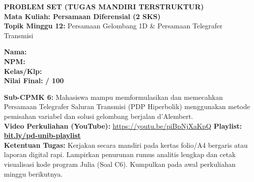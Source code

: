 \documentclass[10pt,a4paper]{article}
\begin{document}
\noindent\begin{minipage}[c]{0.68\textwidth}%
  {\large\textbf{\color{unibblue}PROBLEM SET (TUGAS MANDIRI TERSTRUKTUR)}}\\[1mm]
  {\normalsize\textbf{Mata Kuliah: Persamaan Diferensial (2 SKS)}}\\[0.5mm]
  {\small\textbf{Topik Minggu 12:} Persamaan Gelombang 1D \& Persamaan Telegrafer Transmisi}%
\end{minipage}%
\hfill%
\begin{minipage}[c]{0.30\textwidth}%
  \begin{tcolorbox}[colback=unibblue!5,colframe=unibblue,boxrule=0.6pt,arc=2pt,left=4pt,right=4pt,top=2pt,bottom=2pt]
    \scriptsize
    \textbf{Nama:} \dotfill\\[1.2mm]
    \textbf{NPM:} \dotfill\\[1.2mm]
    \textbf{Kelas/Klp:} \dotfill\\[1.2mm]
    \textbf{Nilai Final:} \hfill \textbf{/ 100}
  \end{tcolorbox}%
\end{minipage}\par

\vspace{1.5mm}

\begin{tcolorbox}[colback=boxbg,colframe=unibgold!90!black,boxrule=0.6pt,arc=2pt,left=5pt,right=5pt,top=3pt,bottom=3pt,title=\textbf{\scriptsize Capaian Pembelajaran (Sub-CPMK 6) \& Pedoman Pengerjaan Tugas}]
  \scriptsize
  \textbf{Sub-CPMK 6:} Mahasiswa mampu memformulasikan dan memecahkan Persamaan Telegrafer Saluran Transmisi (PDP Hiperbolik) menggunakan metode pemisahan variabel dan solusi gelombang berjalan d'Alembert.\\
  \textbf{Video Perkuliahan (YouTube):} \url{https://youtu.be/piBpNjXaKpQ} \hfill \textbf{Playlist:} \href{https://www.youtube.com/playlist?list=PLS5oOZWXZeTw}{\color{unibblue}\textbf{bit.ly/pd-unib-playlist}}\\\textbf{Ketentuan Tugas:} Kerjakan secara mandiri pada kertas folio/A4 bergaris atau laporan digital rapi. Lampirkan penurunan rumus analitis lengkap dan cetak visualisasi kode program Julia (Soal C6). Kumpulkan pada awal perkuliahan minggu berikutnya.
\end{tcolorbox}

\vspace{1.5mm}
\end{document}
